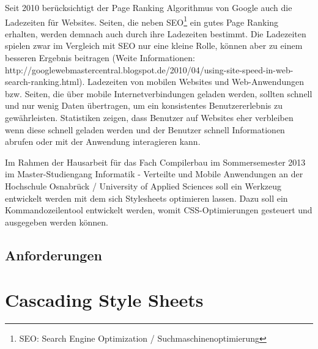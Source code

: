 \documentclass[11pt]{scrartcl}
\begin{document}
Seit 2010 berücksichtigt der Page Ranking Algorithmus von Google auch die Ladezeiten für Websites. Seiten, die neben SEO\footnote{SEO: Search Engine Optimization / Suchmaschinenoptimierung} ein gutes Page Ranking erhalten, werden demnach auch durch ihre Ladezeiten bestimmt. Die Ladezeiten spielen zwar im Vergleich mit SEO nur eine kleine Rolle, können aber zu einem besseren Ergebnis beitragen (Weite Informationen: http://googlewebmastercentral.blogspot.de/2010/04/using-site-speed-in-web-search-ranking.html).
Ladezeiten von mobilen Websites und Web-Anwendungen bzw. Seiten, die über mobile Internetverbindungen geladen werden, sollten schnell und nur wenig Daten übertragen, um ein konsistentes Benutzererlebnis zu gewährleisten. Statistiken zeigen, dass Benutzer auf Websites eher verbleiben wenn diese schnell geladen werden und der Benutzer schnell Informationen abrufen oder mit der Anwendung interagieren kann.

Im Rahmen der Hausarbeit für das Fach Compilerbau im Sommersemester 2013 im Master-Studiengang Informatik - Verteilte und Mobile Anwendungen an der Hochschule Osnabrück / University of Applied Sciences soll ein Werkzeug entwickelt werden mit dem sich Stylesheets optimieren lassen. Dazu soll ein Kommandozeilentool entwickelt werden, womit CSS-Optimierungen gesteuert und ausgegeben werden können. 

\subsection{Anforderungen}

\pagebreak
\section{Cascading Style Sheets}
\end{document}
